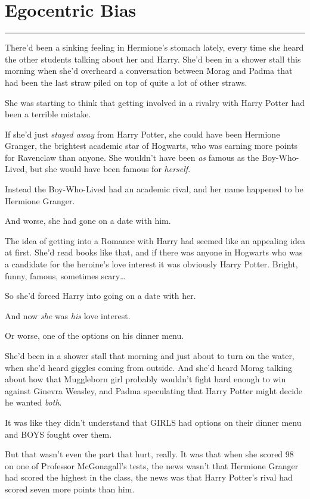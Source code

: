 \chapter{Egocentric Bias}\label{egocentric-bias}

\begin{center}\rule{3in}{0.4pt}\end{center}

There'd been a sinking feeling in Hermione's stomach lately, every time
she heard the other students talking about her and Harry. She'd been in
a shower stall this morning when she'd overheard a conversation between
Morag and Padma that had been the last straw piled on top of quite a lot
of other straws.

She was starting to think that getting involved in a rivalry with Harry
Potter had been a terrible mistake.

If she'd just \emph{stayed away} from Harry Potter, she could have been
Hermione Granger, the brightest academic star of Hogwarts, who was
earning more points for Ravenclaw than anyone. She wouldn't have been
\emph{as} famous as the Boy-Who-Lived, but she would have been famous
for \emph{herself}.

Instead the Boy-Who-Lived had an academic rival, and her name happened
to be Hermione Granger.

And worse, she had gone on a date with him.

The idea of getting into a Romance with Harry had seemed like an
appealing idea at first. She'd read books like that, and if there was
anyone in Hogwarts who was a candidate for the heroine's love interest
it was obviously Harry Potter. Bright, funny, famous, sometimes
scary\ldots{}

So she'd forced Harry into going on a date with her.

And now \emph{she} was \emph{his} love interest.

Or worse, one of the options on his dinner menu.

She'd been in a shower stall that morning and just about to turn on the
water, when she'd heard giggles coming from outside. And she'd heard
Morag talking about how that Muggleborn girl probably wouldn't fight
hard enough to win against Ginevra Weasley, and Padma speculating that
Harry Potter might decide he wanted \emph{both}.

It was like they didn't understand that GIRLS had options on their
dinner menu and BOYS fought over them.

But that wasn't even the part that hurt, really. It was that when she
scored 98 on one of Professor McGonagall's tests, the news wasn't that
Hermione Granger had scored the highest in the class, the news was that
Harry Potter's rival had scored seven more points than him.

